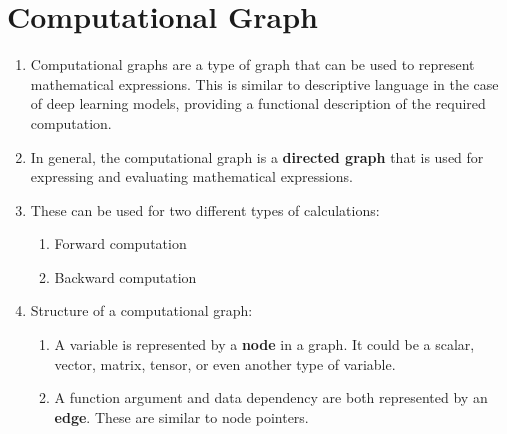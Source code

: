 







\section{Computational Graph}

\begin{enumerate}
    \item 
    \begin{definition}
        Computational graphs are a type of graph that can be used to represent mathematical expressions. 
        This is similar to descriptive language in the case of deep learning models, providing a functional description of the required computation.
        \hfill \cite{geeksforgeeks/deep-learning/computational-graphs-in-deep-learning}
    \end{definition}

    \item In general, the computational graph is a \textbf{directed graph} that is used for expressing and evaluating mathematical expressions. 
    \hfill \cite{geeksforgeeks/deep-learning/computational-graphs-in-deep-learning}

    \item These can be used for two different types of calculations:
    \hfill \cite{geeksforgeeks/deep-learning/computational-graphs-in-deep-learning}
    \begin{enumerate}
        \item Forward computation
        \hfill \cite{geeksforgeeks/deep-learning/computational-graphs-in-deep-learning}
        
        \item Backward computation
        \hfill \cite{geeksforgeeks/deep-learning/computational-graphs-in-deep-learning}
    \end{enumerate}

    \item Structure of a computational graph:
    \begin{enumerate}
        \item A variable is represented by a \textbf{node} in a graph. 
        It could be a scalar, vector, matrix, tensor, or even another type of variable.
        \hfill \cite{geeksforgeeks/deep-learning/computational-graphs-in-deep-learning}
    
        \item A function argument and data dependency are both represented by an \textbf{edge}. 
        These are similar to node pointers.
        \hfill \cite{geeksforgeeks/deep-learning/computational-graphs-in-deep-learning}
    

\end{enumerate}
\end{enumerate}
